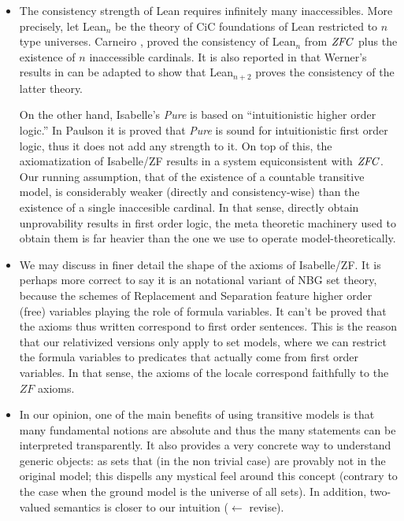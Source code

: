 \begin{itemize}
\item The consistency strength of Lean requires infinitely
  many inaccessibles. More precisely, let Lean$_n$ be the theory of
  CiC foundations of Lean restricted to $n$ type universes.  Carneiro
  \cite{carneiro-ms-thesis}, proved the consistency of Lean$_n$ from
  $\mathit{ZFC}$ plus the existence of $n$ inaccessible
  cardinals. It is also reported in \cite{carneiro-ms-thesis} that
  Werner's results in \cite{10.5555/645869.668660} can be adapted to
  show that Lean$_{n+2}$ proves the consistency of the latter theory. 

  On the other hand, Isabelle's \emph{Pure} is based on
  ``intuitionistic higher order logic.'' In Paulson
  \cite{Paulson1989} it is proved that \emph{Pure} is sound for
  intuitionistic first order logic, thus it does not add any strength
  to it. On top of this, the axiomatization of Isabelle/ZF results in
  a system equiconsistent with $\mathit{ZFC}$. Our running assumption, that of
  the existence of a countable transitive model, is considerably
  weaker (directly and consistency-wise) than the existence of a
  single inaccesible cardinal. In that sense, directly obtain
  unprovability results in first order logic, the meta theoretic
  machinery used to obtain them is far heavier than the one we use to
  operate model-theoretically.
\item We may discuss in finer detail the shape of the axioms of
  Isabelle/ZF. It is perhaps more correct to say it is an
  notational variant of NBG set theory, because the schemes of
  Replacement and Separation feature higher order (free) variables
  playing the role of formula variables. It can't be proved that the
  axioms thus written correspond to first order sentences. This is the
  reason that our relativized versions only apply to set models, where
  we can restrict the formula variables to predicates that actually
  come from first order variables. In that sense, the axioms of the
  locale  correspond faithfully to the
  $ZF$ axioms.
\item {} In our opinion, one of the
  main benefits of using transitive models is that many fundamental
  notions are absolute and thus the many statements can be interpreted
  transparently. It also provides a very concrete way to understand
  generic objects: as sets that (in the non trivial case) are provably
  not in the original model; this dispells any mystical feel around
  this concept (contrary to the case when the ground model is the
  universe of all sets). In addition, two-valued semantics is
  closer to our intuition ($\leftarrow$ revise).
\end{itemize}
